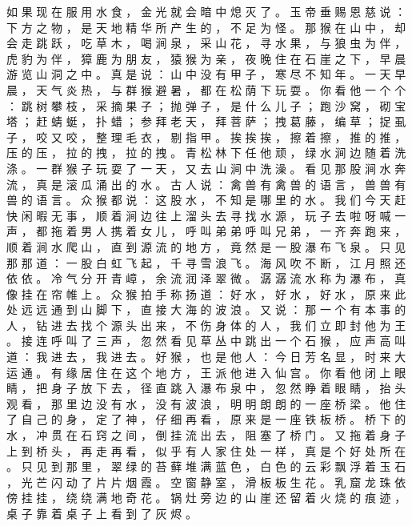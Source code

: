 {如 果 现 在 服 用 水 食 ， 金 光 就 会 暗 中 熄 灭 了 。
玉 帝 垂 赐 恩 慈 说 ： 下 方 之 物 ， 是 天 地 精 华 所 产 生 的 ， 不 足 为 怪 。
那 猴 在 山 中 ， 却 会 走 跳 跃 ， 吃 草 木 ， 喝 涧 泉 ， 采 山 花 ， 寻 水 果 ， 与 狼 虫 为 伴 ， 虎 豹 为 伴 ， 獐 鹿 为 朋 友 ， 猿 猴 为 亲 ， 夜 晚 住 在 石 崖 之 下 ， 早 晨 游 览 山 洞 之 中 。
真 是 说 ： 山 中 没 有 甲 子 ， 寒 尽 不 知 年 。
一 天 早 晨 ， 天 气 炎 热 ， 与 群 猴 避 暑 ， 都 在 松 荫 下 玩 耍 。
你 看 他 一 个 个 ： 跳 树 攀 枝 ， 采 摘 果 子 ； 抛 弹 子 ， 是 什 么 儿 子 ； 跑 沙 窝 ， 砌 宝 塔 ； 赶 蜻 蜓 ， 扑 蜡 ； 参 拜 老 天 ， 拜 菩 萨 ； 拽 葛 藤 ， 编 草 ； 捉 虱 子 ， 咬 又 咬 ， 整 理 毛 衣 ， 剔 指 甲 。
挨 挨 挨 ， 擦 着 擦 ， 推 的 推 ， 压 的 压 ， 拉 的 拽 ， 拉 的 拽 。 青 松 林 下 任 他 顽 ， 绿 水 涧 边 随 着 洗 涤 。
一 群 猴 子 玩 耍 了 一 天 ， 又 去 山 涧 中 洗 澡 。
看 见 那 股 涧 水 奔 流 ， 真 是 滚 瓜 涌 出 的 水 。
古 人 说 ： 禽 兽 有 禽 兽 的 语 言 ， 兽 兽 有 兽 的 语 言 。
众 猴 都 说 ： 这 股 水 ， 不 知 是 哪 里 的 水 。
我 们 今 天 赶 快 闲 暇 无 事 ， 顺 着 涧 边 往 上 溜 头 去 寻 找 水 源 ， 玩 子 去 啦 呀 喊 一 声 ， 都 拖 着 男 人 携 着 女 儿 ， 呼 叫 弟 弟 呼 叫 兄 弟 ， 一 齐 奔 跑 来 ， 顺 着 涧 水 爬 山 ， 直 到 源 流 的 地 方 ， 竟 然 是 一 股 瀑 布 飞 泉 。
只 见 那 那 道 ： 一 股 白 虹 飞 起 ， 千 寻 雪 浪 飞 。
海 风 吹 不 断 ， 江 月 照 还 依 依 。
冷 气 分 开 青 嶂 ， 余 流 润 泽 翠 微 。
潺 潺 流 水 称 为 瀑 布 ， 真 像 挂 在 帘 帷 上 。
众 猴 拍 手 称 扬 道 ： 好 水 ， 好 水 ， 好 水 ， 原 来 此 处 远 远 通 到 山 脚 下 ， 直 接 大 海 的 波 浪 。
又 说 ： 那 一 个 有 本 事 的 人 ， 钻 进 去 找 个 源 头 出 来 ， 不 伤 身 体 的 人 ， 我 们 立 即 封 他 为 王 。
接 连 呼 叫 了 三 声 ， 忽 然 看 见 草 丛 中 跳 出 一 个 石 猴 ， 应 声 高 叫 道 ： 我 进 去 ， 我 进 去 。
好 猴 ， 也 是 他 人 ： 今 日 芳 名 显 ， 时 来 大 运 通 。
有 缘 居 住 在 这 个 地 方 ， 王 派 他 进 入 仙 宫 。
你 看 他 闭 上 眼 睛 ， 把 身 子 放 下 去 ， 径 直 跳 入 瀑 布 泉 中 ， 忽 然 睁 着 眼 睛 ， 抬 头 观 看 ， 那 里 边 没 有 水 ， 没 有 波 浪 ， 明 明 朗 朗 的 一 座 桥 梁 。
他 住 了 自 己 的 身 ， 定 了 神 ， 仔 细 再 看 ， 原 来 是 一 座 铁 板 桥 。
桥 下 的 水 ， 冲 贯 在 石 窍 之 间 ， 倒 挂 流 出 去 ， 阻 塞 了 桥 门 。
又 拖 着 身 子 上 到 桥 头 ， 再 走 再 看 ， 似 乎 有 人 家 住 处 一 样 ， 真 是 个 好 处 所 在 。
只 见 到 那 里 ， 翠 绿 的 苔 藓 堆 满 蓝 色 ， 白 色 的 云 彩 飘 浮 着 玉 石 ， 光 芒 闪 动 了 片 片 烟 霞 。
空 窗 静 室 ， 滑 板 板 生 花 。
乳 窟 龙 珠 依 傍 挂 挂 ， 绕 绕 满 地 奇 花 。
锅 灶 旁 边 的 山 崖 还 留 着 火 烧 的 痕 迹 ， 桌 子 靠 着 桌 子 上 看 到 了 灰 烬 。
}
